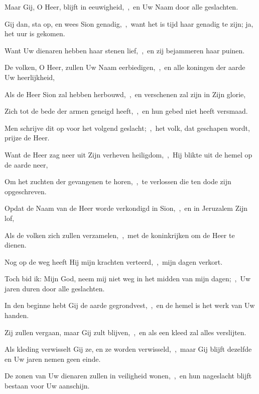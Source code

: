 \documentclass[12pt,twoside,a5paper]{article}
\begin{document}
\begin{halfparskip}
  Maar Gij, O Heer, blijft in eeuwigheid,~\sep\ en Uw Naam door alle geslachten.

  Gij dan, sta op, en wees Sion genadig,~\sep\ want het is tijd haar genadig te zijn; ja, het uur is gekomen.

  Want Uw dienaren hebben haar stenen lief,~\sep\ en zij bejammeren haar puinen.

  De volken, O Heer, zullen Uw Naam eerbiedigen,~\sep\ en alle koningen der aarde Uw heerlijkheid,

  Als de Heer Sion zal hebben herbouwd,~\sep\ en verschenen zal zijn in Zijn glorie,

  Zich tot de bede der armen geneigd heeft,~\sep\ en hun gebed niet heeft versmaad.

  Men schrijve dit op voor het volgend geslacht;~\sep\ het volk, dat geschapen wordt, prijze de Heer.

  Want de Heer zag neer uit Zijn verheven heiligdom,~\sep\ Hij blikte uit de hemel op de aarde neer,

  Om het zuchten der gevangenen te horen,~\sep\ te verlossen die ten dode zijn opgeschreven.

  Opdat de Naam van de Heer worde verkondigd in Sion,~\sep\ en in Jeruzalem Zijn lof,

  Als de volken zich zullen verzamelen,~\sep\ met de koninkrijken om de Heer te dienen.
\end{halfparskip}


\begin{halfparskip}
  Nog op de weg heeft Hij mijn krachten verteerd,~\sep\ mijn dagen verkort.

  Toch bid ik: Mijn God, neem mij niet weg in het midden van mijn dagen;~\sep\ Uw jaren duren door alle geslachten.

  In den beginne hebt Gij de aarde gegrondvest,~\sep\ en de hemel is het werk van Uw handen.

  Zij zullen vergaan, maar Gij zult blijven,~\sep\ en als een kleed zal alles verslijten.

  Als kleding verwisselt Gij ze, en ze worden verwisseld,~\sep\ maar Gij blijft dezelfde en Uw jaren nemen geen einde.

  De zonen van Uw dienaren zullen in veiligheid wonen,~\sep\ en hun nageslacht blijft bestaan voor Uw aanschijn.
\end{halfparskip}
\end{document}
